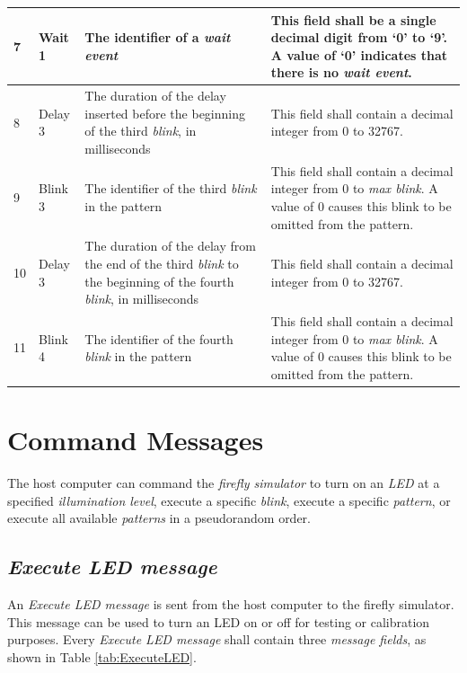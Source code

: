 \documentclass[letterpaper,11pt]{article}
\begin{document}
\begin{table}[H]
\begin{tabular}[h]{|p{0.5in}|p{1.00in}|p{2.25in}|p{2.25in}|}
7            & Wait 1
             & The identifier of a \textit{wait event}
             & This field shall be a single decimal digit from `0' to `9'. A
               value of `0' indicates that there is no \textit{wait event}.
             \\ \hline
8            & Delay 3
             & The duration of the delay inserted before the beginning of the
               third \textit{blink}, in milliseconds
             & This field shall contain a decimal integer from 0 to 32767.
             \\ \hline
9            & Blink 3
             & The identifier of the third \textit{blink} in the pattern
             & This field shall contain a decimal integer from 0 to
             \textit{max blink}. A value of 0 causes this blink to be omitted
             from the pattern.
             \\ \hline
10           & Delay 3
             & The duration of the delay from the end of the third
               \textit{blink} to the beginning of the fourth \textit{blink},
               in milliseconds
             & This field shall contain a decimal integer from 0 to 32767.
             \\ \hline
11           & Blink 4
             & The identifier of the fourth \textit{blink} in the pattern
             & This field shall contain a decimal integer from 0 to
             \textit{max blink}. A value of 0 causes this blink to be omitted
             from the pattern.
             \\ \hline
\end{tabular}
\end{table}

\newpage
\section{Command Messages}

The host computer can command the \textit{firefly simulator} to turn on an
\textit{LED} at a specified \textit{illumination level}, execute a specific
\textit{blink}, execute a specific \textit{pattern}, or execute all available
\textit{patterns} in a pseudorandom order.

\subsection{\textit{Execute LED message}}

An \textit{Execute LED message} is sent from the host computer to the
firefly simulator. This message can be used to turn an LED on or off for
testing or calibration purposes. Every \textit{Execute LED message} shall
contain three \textit{message fields}, as shown in Table \ref{tab:ExecuteLED}.
\end{document}
